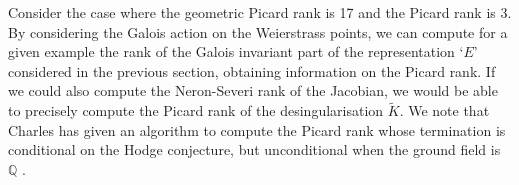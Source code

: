 \documentclass[a4paper,12pt]{amsart}
\begin{document}
Consider the case where the geometric Picard rank is 17 and the Picard rank is 3. By considering the Galois action on the Weierstrass points, we can compute for a given example the rank of the Galois invariant part of the representation `$E$' considered in the previous section, obtaining information on the Picard rank. If we could also compute the Neron-Severi rank of the Jacobian, we would be able to precisely compute the Picard rank of the desingularisation $\tilde{K}$. We note that Charles has given an algorithm to compute the Picard rank whose termination is conditional on the Hodge conjecture, but unconditional when the ground field is ${{\mathbb Q}}$ \cite{CharlesAlgorithm}. 

 

\end{document}

